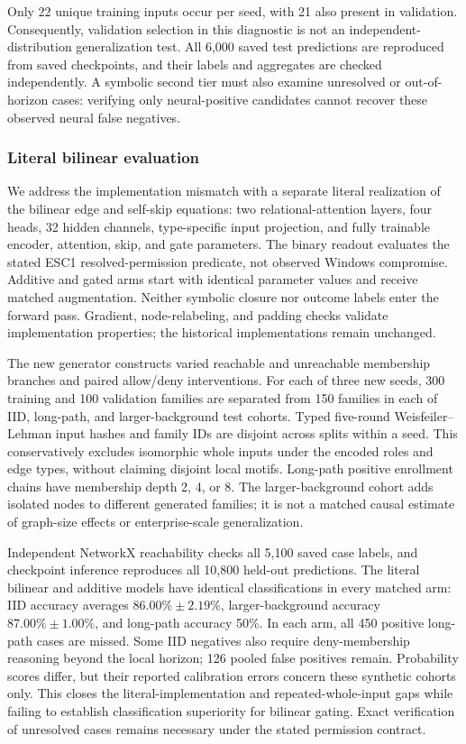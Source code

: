 Only 22 unique training inputs occur per seed, with 21 also present in validation. Consequently, validation selection in this diagnostic is not an independent-distribution generalization test. All 6,000 saved test predictions are reproduced from saved checkpoints, and their labels and aggregates are checked independently. A symbolic second tier must also examine unresolved or out-of-horizon cases: verifying only neural-positive candidates cannot recover these observed neural false negatives.

\subsubsection{Literal bilinear evaluation}
We address the implementation mismatch with a separate literal realization of the bilinear edge and self-skip equations: two relational-attention layers, four heads, 32 hidden channels, type-specific input projection, and fully trainable encoder, attention, skip, and gate parameters. The binary readout evaluates the stated ESC1 resolved-permission predicate, not observed Windows compromise. Additive and gated arms start with identical parameter values and receive matched augmentation. Neither symbolic closure nor outcome labels enter the forward pass. Gradient, node-relabeling, and padding checks validate implementation properties; the historical implementations remain unchanged.

The new generator constructs varied reachable and unreachable membership branches and paired allow/deny interventions. For each of three new seeds, 300 training and 100 validation families are separated from 150 families in each of IID, long-path, and larger-background test cohorts. Typed five-round Weisfeiler--Lehman input hashes and family IDs are disjoint across splits within a seed. This conservatively excludes isomorphic whole inputs under the encoded roles and edge types, without claiming disjoint local motifs. Long-path positive enrollment chains have membership depth 2, 4, or 8. The larger-background cohort adds isolated nodes to different generated families; it is not a matched causal estimate of graph-size effects or enterprise-scale generalization.



Independent NetworkX reachability checks all 5,100 saved case labels, and checkpoint inference reproduces all 10,800 held-out predictions. The literal bilinear and additive models have identical classifications in every matched arm: IID accuracy averages $86.00\%\pm2.19\%$, larger-background accuracy $87.00\%\pm1.00\%$, and long-path accuracy 50\%. In each arm, all 450 positive long-path cases are missed. Some IID negatives also require deny-membership reasoning beyond the local horizon; 126 pooled false positives remain. Probability scores differ, but their reported calibration errors concern these synthetic cohorts only. This closes the literal-implementation and repeated-whole-input gaps while failing to establish classification superiority for bilinear gating. Exact verification of unresolved cases remains necessary under the stated permission contract.

